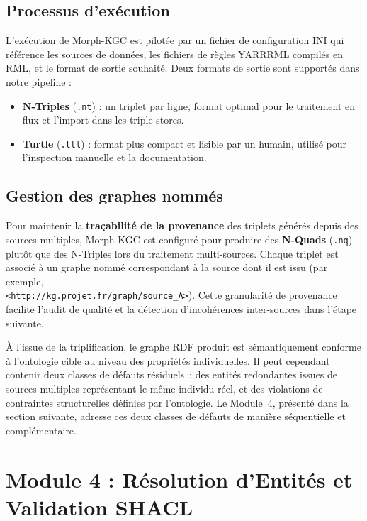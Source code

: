 \subsection{Processus d'exécution}

L'exécution de Morph-KGC est pilotée par un fichier de configuration INI
qui référence les sources de données, les fichiers de règles YARRRML compilés
en RML, et le format de sortie souhaité.
Deux formats de sortie sont supportés dans notre pipeline :
\begin{itemize}
    \item \textbf{N-Triples} (\texttt{.nt}) : un triplet par ligne, format
          optimal pour le traitement en flux et l'import dans les triple stores.
    \item \textbf{Turtle} (\texttt{.ttl}) : format plus compact et lisible
          par un humain, utilisé pour l'inspection manuelle et la documentation.
\end{itemize}

\subsection{Gestion des graphes nommés}

Pour maintenir la \textbf{traçabilité de la provenance} des triplets générés
depuis des sources multiples, Morph-KGC est configuré pour produire des
\textbf{N-Quads} (\texttt{.nq}) plutôt que des N-Triples lors du traitement
multi-sources.
Chaque triplet est associé à un graphe nommé correspondant à la source dont il
est issu (par exemple,\\  \texttt{<http://kg.projet.fr/graph/source\_A>}).
Cette granularité de provenance facilite l'audit de qualité et la détection
d'incohérences inter-sources dans l'étape suivante.

\medskip
À l'issue de la triplification, le graphe RDF produit est sémantiquement
conforme à l'ontologie cible au niveau des propriétés individuelles. Il
peut cependant contenir deux classes de défauts résiduels~: des entités
redondantes issues de sources multiples représentant le même individu réel,
et des violations de contraintes structurelles définies par l'ontologie. Le
Module~4, présenté dans la section suivante, adresse ces deux classes de
défauts de manière séquentielle et complémentaire.

\section{Module 4 : Résolution d'Entités et Validation SHACL}
\label{sec:module_validation}

